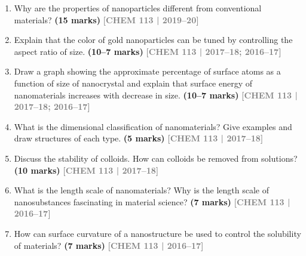 \documentclass[12pt,a3paper]{article}
\newcommand{\yr}[1]{\hfill\textcolor{gray}{\small\textbf{[#1]}}}
\newcommand{\mk}[1]{\textcolor{orange!70!black}{\small\textbf{(#1 marks)}}}
\begin{document}
\begin{enumerate}
\item Why are the properties of nanoparticles different from conventional materials? \mk{15}
\yr{CHEM 113 | 2019--20}




\item Explain that the color of gold nanoparticles can be tuned by controlling the aspect ratio of size. \mk{10--7}
\yr{CHEM 113 | 2017--18; 2016--17}




\item Draw a graph showing the approximate percentage of surface atoms as a function of size of nanocrystal and explain that surface energy of nanomaterials increases with decrease in size. \mk{10--7}
\yr{CHEM 113 | 2017--18; 2016--17}





\item What is the dimensional classification of nanomaterials? Give examples and draw structures of each type. \mk{5}
\yr{CHEM 113 | 2017--18}




\item Discuss the stability of colloids. How can colloids be removed from solutions? \mk{10}
\yr{CHEM 113 | 2017--18}




\item What is the length scale of nanomaterials? Why is the length scale of nanosubstances fascinating in material science? \mk{7}
\yr{CHEM 113 | 2016--17}




\item How can surface curvature of a nanostructure be used to control the solubility of materials? \mk{7}
\yr{CHEM 113 | 2016--17}





\end{enumerate}
\end{document}
